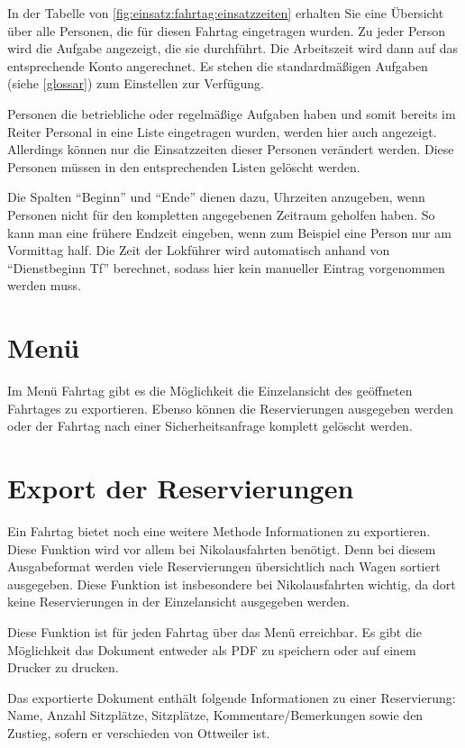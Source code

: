 In der Tabelle von \cref{fig:einsatz:fahrtag:einsatzzeiten} erhalten Sie eine Übersicht über alle Personen,
die für diesen Fahrtag eingetragen wurden.
Zu jeder Person wird die Aufgabe angezeigt, die sie durchführt.
Die Arbeitszeit wird dann auf das entsprechende Konto angerechnet.
Es stehen die standardmäßigen Aufgaben (siehe \cref{glossar}) zum Einstellen zur Verfügung.

Personen die betriebliche oder regelmäßige Aufgaben haben und somit bereits im Reiter Personal in eine Liste eingetragen wurden, werden hier auch angezeigt.
Allerdings können nur die Einsatzzeiten dieser Personen verändert werden.
Diese Personen müssen in den entsprechenden Listen gelöscht werden.


Die Spalten "`Beginn"' und "`Ende"' dienen dazu, Uhrzeiten anzugeben, wenn Personen nicht für den kompletten angegebenen Zeitraum geholfen haben.
So kann man eine frühere Endzeit eingeben, wenn zum Beispiel eine Person nur am Vormittag half.
Die Zeit der Lokführer wird automatisch anhand von "`Dienstbeginn Tf"' berechnet,
sodass hier kein manueller Eintrag vorgenommen werden muss.



\section{Menü}
Im Menü Fahrtag gibt es die Möglichkeit die Einzelansicht des geöffneten Fahrtages zu exportieren.
Ebenso können die Reservierungen ausgegeben werden oder der Fahrtag nach einer Sicherheitsanfrage komplett gelöscht werden.



\section{Export der Reservierungen}
Ein Fahrtag bietet noch eine weitere Methode Informationen zu exportieren.
Diese Funktion wird vor allem bei Nikolausfahrten benötigt.
Denn bei diesem Ausgabeformat werden viele Reservierungen übersichtlich nach Wagen sortiert ausgegeben.
Diese Funktion ist insbesondere bei Nikolausfahrten wichtig, da dort keine Reservierungen in der Einzelansicht ausgegeben werden.

Diese Funktion ist für jeden Fahrtag über das Menü  erreichbar.
Es gibt die Möglichkeit das Dokument entweder als PDF zu speichern oder auf einem Drucker zu drucken.

Das exportierte Dokument enthält folgende Informationen zu einer Reservierung: Name, Anzahl Sitzplätze, Sitzplätze, Kommentare/Bemerkungen sowie den Zustieg, sofern er verschieden von Ottweiler ist.
